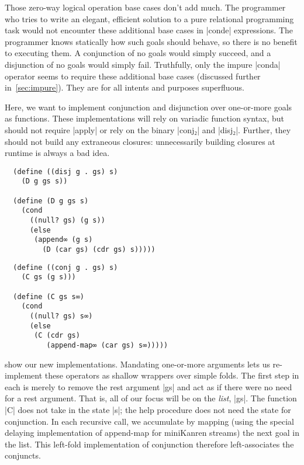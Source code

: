 \documentclass[sigplan,screen,draft,anonymous,review,natbib=false]{acmart}
\begin{document}
Those zero-way logical operation base cases don't add much. The
programmer who tries to write an elegant, efficient solution to a pure
relational programming task would not encounter these additional base
cases in \rackinline|conde| expressions. The programmer knows
statically how such goals should behave, so there is no benefit to
executing them. A conjunction of no goals would simply succeed, and a
disjunction of no goals would simply fail. Truthfully, only the impure
\rackinline|conda| operator seems to require these additional base
cases (discussed further in~\cref{sec:impure}). They are for all
intents and purposes superfluous.

Here, we want to implement conjunction and disjunction over
one-or-more goals as functions. These implementations will rely on
variadic function syntax, but should not require \rackinline|apply| or
rely on the binary \rackinline|conj₂| and \rackinline|disj₂|. Further,
they should not build any extraneous closures: unnecessarily building
closures at runtime is always a bad idea.

\begin{listing}
  \begin{verbatim}
  (define ((disj g . gs) s)
    (D g gs s))

  (define (D g gs s)
    (cond
      ((null? gs) (g s))
      (else
       (append∞ (g s)
         (D (car gs) (cdr gs) s)))))
  \end{verbatim}
  \caption{Re-implementation of \rackinline|disj|.}
  \label{mnt:disj-reimplementation}
\end{listing}

\begin{listing}
  \begin{verbatim}
  (define ((conj g . gs) s)
    (C gs (g s)))

  (define (C gs s∞)
    (cond
      ((null? gs) s∞)
      (else
       (C (cdr gs)
          (append-map∞ (car gs) s∞)))))
  \end{verbatim}
  \caption{Re-implementation of \rackinline|conj|.}
  \label{mnt:conj-reimplementation}
\end{listing}

 show our new
implementations. Mandating one-or-more arguments lets us re-implement
these operators as shallow wrappers over simple folds. The first step
in each is merely to remove the rest argument \rackinline|gs| and act
as if there were no need for a rest argument. That is, all of our
focus will be on the \emph{list}, \rackinline|gs|. The function
\rackinline|C| does not take in the state \rackinline|s|; the help
procedure does not need the state for conjunction. In each recursive
call, we accumulate by mapping (using the special delaying
implementation of append-map for miniKanren streams) the next goal in
the list. This left-fold implementation of conjunction therefore
left-associates the conjuncts.
\end{document}

